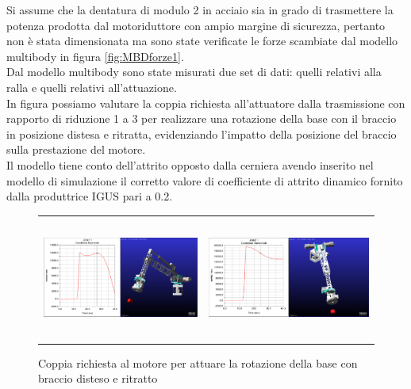 \documentclass[%
corpo=11pt,
twoside,
 stile=classica,
oldstyle,
greek,%
]{toptesi}
\begin{document}
		Si assume che la dentatura di modulo 2 in acciaio sia in grado di trasmettere la potenza prodotta dal motoriduttore con ampio margine di sicurezza, pertanto non è stata dimensionata ma sono state verificate le forze scambiate dal modello multibody in figura \ref{fig:MBDforze1}. \\
		Dal modello multibody sono state misurati due set di dati: quelli relativi alla ralla e quelli relativi all'attuazione. \\
		In figura possiamo valutare la coppia richiesta all'attuatore dalla trasmissione con rapporto di riduzione 1 a 3 per realizzare una rotazione della base con il braccio in posizione distesa e ritratta, evidenziando l'impatto della posizione del braccio sulla prestazione del motore. \\
		Il modello tiene conto dell'attrito opposto dalla cerniera avendo inserito nel modello di simulazione il corretto valore di coefficiente di attrito dinamico fornito dalla produttrice IGUS pari a 0.2. 

		\begin{figure} [!ht]
			\centering
			\begin{tabular}{ll}
				\includegraphics[height=4cm,keepaspectratio]{Plots/BASE/joint1_FAVOREVOLE.png}
				&
				\includegraphics[height=4cm,keepaspectratio]{Plots/BASE/joint1_sfavorevole.png}
			\end{tabular}
			\caption{Coppia richiesta al motore per attuare la rotazione della base con braccio disteso e ritratto}
			\label{fig:MBDcoppia1}
		\end{figure}
	
\end{document}
